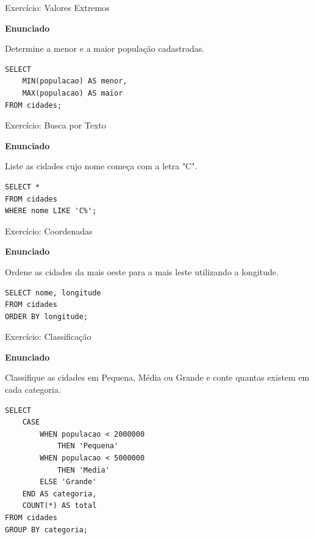 \documentclass{beamer}
\begin{document}
\begin{frame}[fragile]{Exercício: Valores Extremos}

\textbf{Enunciado}

Determine a menor e a maior população cadastradas.
\pause
\begin{verbatim}
SELECT
    MIN(populacao) AS menor,
    MAX(populacao) AS maior
FROM cidades;
\end{verbatim}

\end{frame}

\begin{frame}[fragile]{Exercício: Busca por Texto}

\textbf{Enunciado}

Liste as cidades cujo nome começa com a letra "C".
\pause
\begin{verbatim}
SELECT *
FROM cidades
WHERE nome LIKE 'C%';
\end{verbatim}

\end{frame}

\begin{frame}[fragile]{Exercício: Coordenadas}

\textbf{Enunciado}

Ordene as cidades da mais oeste para a mais leste utilizando a longitude.
\pause
\begin{verbatim}
SELECT nome, longitude
FROM cidades
ORDER BY longitude;
\end{verbatim}

\end{frame}

\begin{frame}[fragile]{Exercício: Classificação}

\textbf{Enunciado}

Classifique as cidades em Pequena, Média ou Grande e conte quantas existem em cada categoria.
\pause
\begin{verbatim}
SELECT
    CASE
        WHEN populacao < 2000000
            THEN 'Pequena'
        WHEN populacao < 5000000
            THEN 'Media'
        ELSE 'Grande'
    END AS categoria,
    COUNT(*) AS total
FROM cidades
GROUP BY categoria;
\end{verbatim}

\end{frame}
\end{document}
